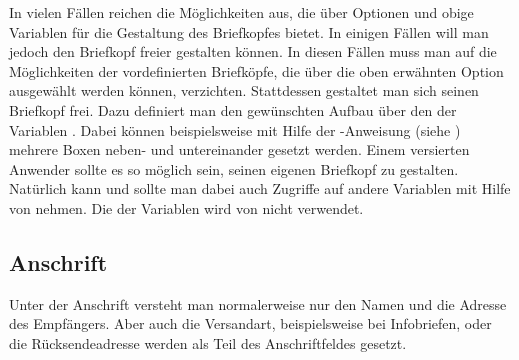\begin{Declaration}
\end{Declaration}
In vielen Fällen reichen die Möglichkeiten aus, die  über
Optionen und obige Variablen für die Gestaltung des Briefkopfes bietet. In
einigen Fällen will man jedoch den Briefkopf freier gestalten können. In
diesen Fällen muss man auf die Möglichkeiten der vordefinierten Briefköpfe,
die über die oben erwähnten Option ausgewählt werden können,
verzichten. Stattdessen gestaltet man sich seinen Briefkopf frei. Dazu
definiert man den gewünschten Aufbau über den  der Variablen
. Dabei können beispielsweise mit Hilfe der
-Anweisung (siehe \cite{latex:usrguide}) mehrere Boxen neben-
und untereinander gesetzt werden.  Einem versierten Anwender sollte es so
möglich sein, seinen eigenen Briefkopf zu gestalten. Natürlich kann und sollte
man dabei auch Zugriffe auf andere Variablen mit Hilfe von
 nehmen. Die  der
Variablen  wird von \KOMAScript{} nicht verwendet.
%
\EndIndexGroup
%
\EndIndexGroup


\subsection{Anschrift}
%
\BeginIndexGroup
{}%

Unter der Anschrift versteht man normalerweise nur den Namen und die Adresse
des Empfängers. %
\iffalse%
Als \iffree{erste }{}Erweiterung zur Anschrift kann die
Versandart betrachtet werden, die etwa bei \iffree{Einschreiben oder
}{}Infobriefen zur Anwendung kommt. Bei Fensterbriefumschlägen wird auch die
sogenannte Rücksendeadresse \iffree{zur Anschrift}{dazu} gezählt, da sie im
Anschriftfenster zu sehen \iffree{sein wird}{ist}. Die Anschrift folgt
unmittelbar auf den Briefkopf.%
\else%
Aber auch die Versandart, beispielsweise bei Infobriefen, oder die
Rücksendeadresse werden als Teil des Anschriftfeldes gesetzt.%
\fi


